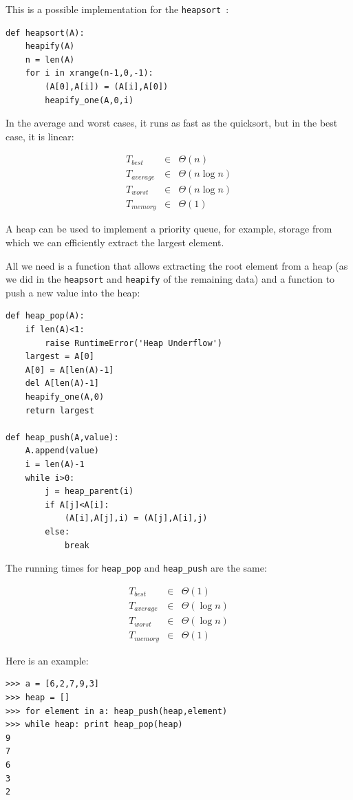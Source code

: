 \documentclass[justified,sixbynine]{tufte-book}
\def\ft{\small\tt}
\theoremstyle{plain}%
\theoremstyle{definition}
\theoremstyle{remark}
\begin{document}
\begin{fullwidth}
This is a possible implementation for the {\ft heapsort}~\cite{heapsort}:

\begin{lstlisting}
def heapsort(A):
    heapify(A)
    n = len(A)
    for i in xrange(n-1,0,-1):
        (A[0],A[i]) = (A[i],A[0])
        heapify_one(A,0,i)
\end{lstlisting}

In the average and worst cases, it runs as fast as the quicksort, but in the best case, it is linear:

\begin{eqnarray}
T_{best} &\in &\Theta (n) \\
T_{average} &\in &\Theta (n\log n) \\
T_{worst} &\in &\Theta (n\log n) \\
T_{memory} &\in &\Theta (1)
\end{eqnarray}


A heap can be used to implement a priority queue, for example, storage from which we can efficiently extract the largest element.

All we need is a function that allows extracting the root element from a heap (as we did in the {\ft heapsort} and {\ft heapify} of the remaining data) and a function to push a new value into the heap:

\begin{lstlisting}
def heap_pop(A):
    if len(A)<1:
        raise RuntimeError('Heap Underflow')
    largest = A[0]
    A[0] = A[len(A)-1]
    del A[len(A)-1]
    heapify_one(A,0)
    return largest

def heap_push(A,value):
    A.append(value)
    i = len(A)-1
    while i>0:
        j = heap_parent(i)
        if A[j]<A[i]:
            (A[i],A[j],i) = (A[j],A[i],j)
        else:
            break
\end{lstlisting}

The running times for {\ft heap\_pop} and {\ft heap\_push} are the same:

\begin{eqnarray}
T_{best} &\in &\Theta (1) \\
T_{average} &\in &\Theta (\log n) \\
T_{worst} &\in &\Theta (\log n) \\
T_{memory} &\in &\Theta (1)
\end{eqnarray}

Here is an example:

\begin{lstlisting}
>>> a = [6,2,7,9,3]
>>> heap = []
>>> for element in a: heap_push(heap,element)
>>> while heap: print heap_pop(heap)
9
7
6
3
2
\end{lstlisting}


\end{fullwidth}
\end{document}
